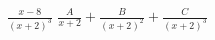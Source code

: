 {$\displaystyle \frac{x-8}{(x+2)^3}$}
{$\displaystyle \frac{A}{x+2} + \frac{B}{(x+2)^2} + \frac{C}{(x+2)^3}$}
